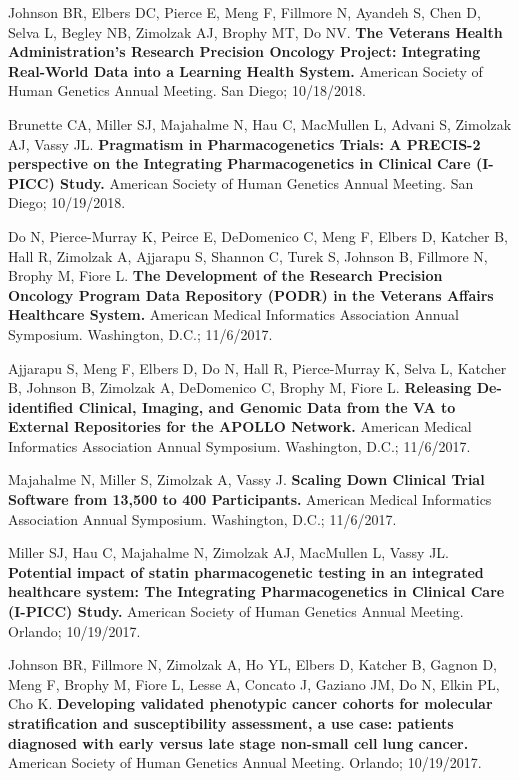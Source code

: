 \documentclass[10pt]{article}
\begin{document}
Johnson BR, Elbers DC, Pierce E, Meng F, Fillmore N, Ayandeh S, Chen
D, Selva L, Begley NB, Zimolzak AJ, Brophy MT, Do NV. \textbf{The
  Veterans Health Administration's Research Precision Oncology
  Project: Integrating Real-World Data into a Learning Health System.}
American Society of Human Genetics Annual Meeting. San Diego;
10/18/2018.

Brunette CA, Miller SJ, Majahalme N, Hau C, MacMullen L, Advani S,
Zimolzak AJ, Vassy JL. \textbf{Pragmatism in Pharmacogenetics Trials:
  A PRECIS-2 perspective on the Integrating Pharmacogenetics in
  Clinical Care (I-PICC) Study.} American Society of Human Genetics
Annual Meeting. San Diego; 10/19/2018.

Do N, Pierce-Murray K, Peirce E, DeDomenico C, Meng F, Elbers D,
Katcher B, Hall R, Zimolzak A, Ajjarapu S, Shannon C, Turek S, Johnson
B, Fillmore N, Brophy M, Fiore L. \textbf{The Development of the
  Research Precision Oncology Program Data Repository (PODR) in the
  Veterans Affairs Healthcare System.} American Medical Informatics
Association Annual Symposium. Washington, D.C.; 11/6/2017.

Ajjarapu S, Meng F, Elbers D, Do N, Hall R, Pierce-Murray K, Selva L,
Katcher B, Johnson B, Zimolzak A, DeDomenico C, Brophy M, Fiore L.
\textbf{Releasing De-identified Clinical, Imaging, and Genomic Data
  from the VA to External Repositories for the APOLLO Network.}
American Medical Informatics Association Annual Symposium. Washington,
D.C.; 11/6/2017.

Majahalme N, Miller S, Zimolzak A, Vassy J. \textbf{Scaling Down
  Clinical Trial Software from 13,500 to 400 Participants.} American
Medical Informatics Association Annual Symposium. Washington, D.C.;
11/6/2017.

Miller SJ, Hau C, Majahalme N, Zimolzak AJ, MacMullen L, Vassy JL.
\textbf{Potential impact of statin pharmacogenetic testing in an
  integrated healthcare system: The Integrating Pharmacogenetics in
  Clinical Care (I-PICC) Study.} American Society of Human Genetics
Annual Meeting. Orlando; 10/19/2017.

Johnson BR, Fillmore N, Zimolzak A, Ho YL, Elbers D, Katcher B, Gagnon
D, Meng F, Brophy M, Fiore L, Lesse A, Concato J, Gaziano JM, Do N,
Elkin PL, Cho K. \textbf{Developing validated phenotypic cancer
  cohorts for molecular stratification and susceptibility assessment,
  a use case: patients diagnosed with early versus late stage
  non-small cell lung cancer.} American Society of Human Genetics
Annual Meeting. Orlando; 10/19/2017.
\end{document}
